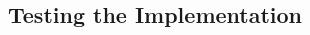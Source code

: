 \begin{frame}
\begin{multicols}{2}
        \vspace*{\fill}

    \end{multicols}
    \vspace*{\fill}
    
\end{frame}


    

\subsection{Testing the Implementation}


